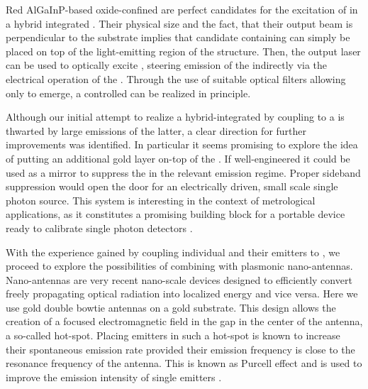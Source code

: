 
   Red AlGaInP-based oxide-confined \VCSELs are perfect candidates for the excitation of \sivs in a hybrid integrated \sps. Their physical size and the fact, that their output beam is perpendicular to the substrate implies that candidate \nds containing \sivs can simply be placed on top of the light-emitting region of the structure. Then, the \VCSELs output laser can be used to optically excite \sivs, steering emission of the \siv indirectly via the electrical operation of the \VCSEL. Through the use of suitable optical filters allowing only \siv \fl to emerge, a controlled \sps can be realized in principle.

   Although our initial attempt to realize a hybrid-integrated \sps by coupling \sivs to a \VCSEL is thwarted by large \sb emissions of the latter, a clear direction for further improvements was identified. In particular it seems promising to explore the idea of putting an additional gold layer on-top of the \VCSEL. If well-engineered it could be used as a mirror to suppress the \VCSEL \sb in the relevant \siv emission regime. Proper sideband suppression would open the door for an electrically driven, small scale single photon source. This system is interesting in the context of metrological applications, as it constitutes a promising building block for a portable device ready to calibrate single photon detectors .


   With the experience gained by coupling individual \nds and their emitters to \VCSELs, we proceed to explore the possibilities of combining \sivs with plasmonic nano-antennas. Nano-antennas are very recent nano-scale devices designed to efficiently convert freely propagating optical radiation into localized energy and vice versa. Here we use gold double bowtie antennas on a gold substrate. This design allows the creation of a focused electromagnetic field in the gap in the center of the antenna, a so-called hot-spot. Placing emitters in such a hot-spot is known to increase their spontaneous emission rate provided their emission frequency is close to the resonance frequency of the antenna. This is known as Purcell effect and is used to improve the emission intensity of single emitters \cite{purcell1995spontaneous}.

